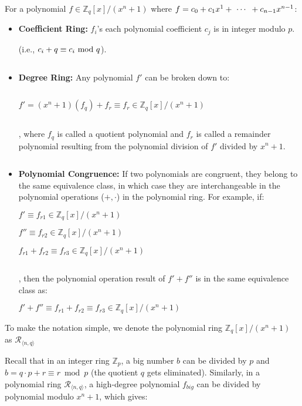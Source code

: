 \begin{tcolorbox}[title={\textbf{\tboxlabel{\ref*{subsec:poly-ring-overview}} Ring}}]

For a polynomial $f \in \mathbb{Z}_q[x] / (x^n + 1)$ where $f = c_0 + c_1x^1 + \text{ } \text{$\cdots$} \text{ } + c_{n-1}x^{n-1}$:

\begin{itemize}
\item \textbf{Coefficient Ring:} $f_i$'s each polynomial coefficient $c_j$ is in integer modulo $p$.

(i.e., $c_i + q \equiv c_i \text{ } \text{\text{mod}} \text{ } q$). 

$ $

\item \textbf{Degree Ring:} Any polynomial $f'$ can be broken down to: 

$ $

$f' = (x^n + 1)(f_q) + f_r \equiv f_r \in \mathbb{Z}_q[x]/(x^n + 1)$

$ $

, where $f_q$ is called a quotient polynomial and $f_r$ is called a remainder polynomial resulting from the polynomial division of $f'$ divided by $x^n + 1$.

$ $

\item \textbf{Polynomial Congruence:} If two polynomials are congruent, they belong to the same equivalence class, in which case they are interchangeable in the polynomial operations ($+, \cdot$) in the polynomial ring. For example, if: 

$f' \equiv f_{r1} \in \mathbb{Z}_q[x] / (x^n + 1)$

$f{''} \equiv f_{r2} \in \mathbb{Z}_q[x] / (x^n + 1)$

$f_{r1} + f_{r2} \equiv f_{r3} \in \mathbb{Z}_q[x] / (x^n + 1)$

$ $

, then the polynomial operation result of $f' + f''$ is in the same equivalence class as: 

$f' + f'' \equiv f_{r1} + f_{r2} \equiv f_{r3} \in \mathbb{Z}_q[x] / (x^n + 1)$


\end{itemize}

To make the notation simple, we denote the polynomial ring $\mathbb{Z}_q[x] / (x^n + 1)$ as $\mathcal{R}_{\langle n, q \rangle}$
\end{tcolorbox}

Recall that in an integer ring $\mathbb{Z}_p$, a big number $b$ can be divided by $p$ and $b = q \cdot p + r \equiv r \bmod p$ (the quotient $q$ gets eliminated). Similarly, in a polynomial ring $\mathcal{R}_{\langle n, q \rangle}$, a high-degree polynomial $f_{big}$ can be divided by polynomial modulo $x^n + 1$, which gives:

